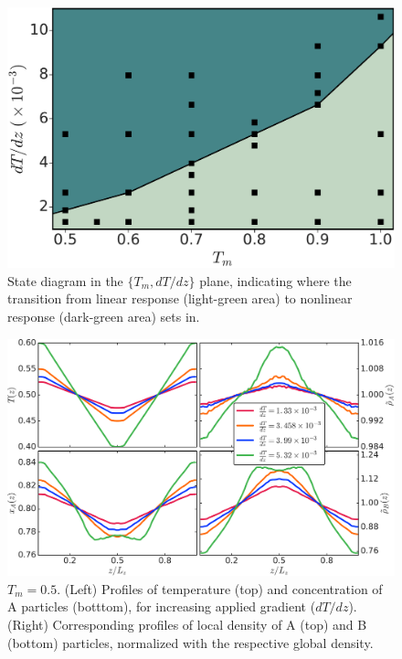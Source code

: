 \begin{figure}[hbt!]
    \centering
	\includegraphics[width=12cm]{figs/fig3p8.pdf}
	\caption[{\em State diagram in the $\{T_m, dT/dz\}$ plane, indicating linear and nonlinear response}]{State diagram in the $\{T_m, dT/dz\}$ plane, indicating where the transition from linear response (light-green area) to nonlinear response (dark-green area) sets in.\label{fig3p8}}
\end{figure}
%
\begin{figure}[hbt!]
    \centering
	\includegraphics[width=15cm]{figs/fig3p9.pdf}
	\caption[{\em Thermal response at $T_m=0.5$}]{$T_m=0.5$. (Left) Profiles of temperature (top) and concentration of A particles (botttom), for increasing applied gradient ($dT/dz$). (Right) Corresponding profiles of local density of A (top) and B (bottom) particles, normalized with the respective global density.\label{fig3p9}}
\end{figure}

